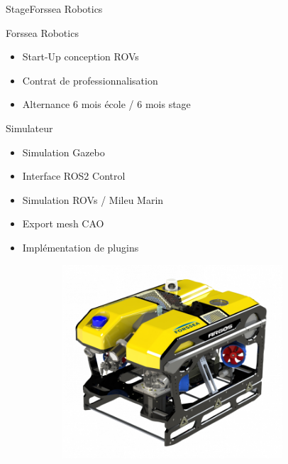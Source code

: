 \begin{frame}{Stage}{Forssea Robotics}
    \begin{minipage}{0.5\textwidth}
        \begin{block}{Forssea Robotics}
            \begin{itemize}
                \item Start-Up conception ROVs \\
                \item Contrat de professionnalisation \\
                \item Alternance 6 mois école / 6 mois stage
            \end{itemize}
        \end{block}
        \begin{block}{Simulateur}
            \begin{itemize}
                \item Simulation Gazebo\\
                \item Interface ROS2 Control \\
                \item Simulation ROVs / Mileu Marin \\
                \item Export mesh CAO \\
                \item Implémentation de plugins
            \end{itemize}
        \end{block}
    \end{minipage}
    \hfill
    \begin{minipage}{0.45\textwidth}
        \begin{figure}
            \centering
            \begin{subfigure}[b]{0.48\textwidth}
                \centering
                \includegraphics[width=0.9\textwidth]{images/internship_forssea/argos.png}

\end{subfigure}
\end{figure}
\end{minipage}
\end{frame}
